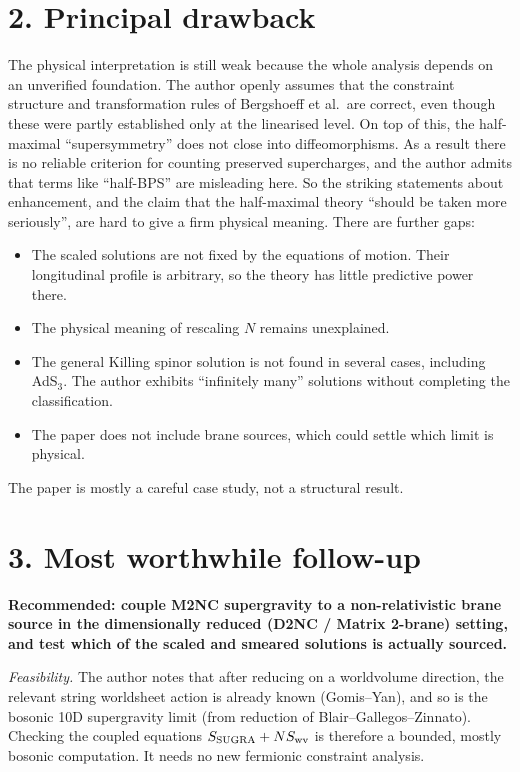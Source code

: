 \documentclass[11pt]{article}
\begin{document}
\section*{2. Principal drawback}
The physical interpretation is still weak because the whole analysis depends on an unverified foundation. The author openly assumes that the constraint structure and transformation rules of Bergshoeff et al.\ are correct, even though these were partly established only at the linearised level. On top of this, the half-maximal ``supersymmetry'' does not close into diffeomorphisms. As a result there is no reliable criterion for counting preserved supercharges, and the author admits that terms like ``half-BPS'' are misleading here. So the striking statements about enhancement, and the claim that the half-maximal theory ``should be taken more seriously'', are hard to give a firm physical meaning. There are further gaps:
\begin{itemize}
\item The scaled solutions are not fixed by the equations of motion. Their longitudinal profile is arbitrary, so the theory has little predictive power there.
\item The physical meaning of rescaling $N$ remains unexplained.
\item The general Killing spinor solution is not found in several cases, including AdS$_3$. The author exhibits ``infinitely many'' solutions without completing the classification.
\item The paper does not include brane sources, which could settle which limit is physical.
\end{itemize}
The paper is mostly a careful case study, not a structural result.

\section*{3. Most worthwhile follow-up}
\textbf{Recommended: couple M2NC supergravity to a non-relativistic brane source in the dimensionally reduced (D2NC / Matrix 2-brane) setting, and test which of the scaled and smeared solutions is actually sourced.}

\emph{Feasibility.} The author notes that after reducing on a worldvolume direction, the relevant string worldsheet action is already known (Gomis--Yan), and so is the bosonic 10D supergravity limit (from reduction of Blair--Gallegos--Zinnato). Checking the coupled equations $S_{\rm SUGRA}+N S_{\rm wv}$ is therefore a bounded, mostly bosonic computation. It needs no new fermionic constraint analysis.
\end{document}
